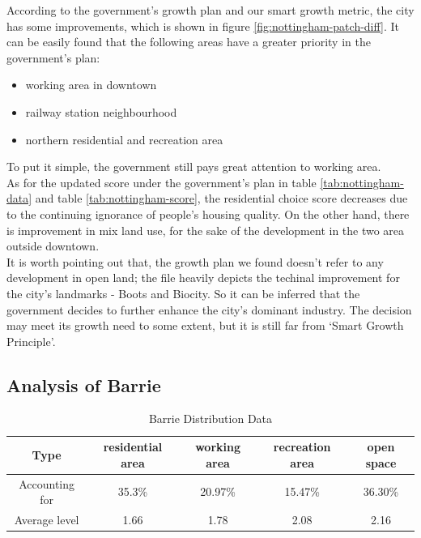According to the government's growth plan and our smart growth metric, the city has some improvements, which is shown in figure \ref{fig:nottingham-patch-diff}.
It can be easily found that the following areas have a greater priority in the government's plan:
\begin{itemize}
  \item working area in downtown
  \item railway station neighbourhood
  \item northern residential and recreation area
\end{itemize}
To put it simple, the government still pays great attention to working area.
\\
As for the updated score under the government's plan in table \ref{tab:nottingham-data} and table \ref{tab:nottingham-score}, the residential choice score decreases due to the continuing ignorance of people's housing quality.
On the other hand, there is improvement in mix land use, for the sake of the development in the two area outside downtown.
\\
It is worth pointing out that, the growth plan we found doesn't refer to any development in open land; the file heavily depicts the techinal improvement for the city's landmarks - Boots and Biocity.
So it can be inferred that the government decides to further enhance the city's dominant industry.
The decision may meet its growth need to some extent, but it is still far from `Smart Growth Principle'.

\subsection{Analysis of Barrie}
\begin{table}[tb]
\centering
  \begin{tabular}{c|cccc}
    \hline
    Type & residential area & working area & recreation area & open space \\
    \hline
    Accounting for & 35.3\% & 20.97\% & 15.47\% & 36.30\% \\
    \hline
    Average level & 1.66 & 1.78 & 2.08 & 2.16 \\
    \hline
  \end{tabular}
  \caption{Barrie Distribution Data}
  \label{tab:barrie-data}
\end{table}

